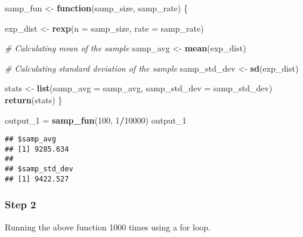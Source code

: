 \documentclass[]{article}
\newenvironment{Shaded}{\begin{snugshade}}{\end{snugshade}}
\newcommand{\KeywordTok}[1]{\textcolor[rgb]{0.13,0.29,0.53}{\textbf{#1}}}
\newcommand{\DataTypeTok}[1]{\textcolor[rgb]{0.13,0.29,0.53}{#1}}
\newcommand{\DecValTok}[1]{\textcolor[rgb]{0.00,0.00,0.81}{#1}}
\newcommand{\StringTok}[1]{\textcolor[rgb]{0.31,0.60,0.02}{#1}}
\newcommand{\CommentTok}[1]{\textcolor[rgb]{0.56,0.35,0.01}{\textit{#1}}}
\newcommand{\ControlFlowTok}[1]{\textcolor[rgb]{0.13,0.29,0.53}{\textbf{#1}}}
\newcommand{\OperatorTok}[1]{\textcolor[rgb]{0.81,0.36,0.00}{\textbf{#1}}}
\newcommand{\NormalTok}[1]{#1}
\begin{document}
\begin{Shaded}
\begin{Highlighting}[]
\NormalTok{samp_fun <-}\StringTok{ }\ControlFlowTok{function}\NormalTok{(samp_size, samp_rate) \{}
  
\NormalTok{  exp_dist <-}\StringTok{ }\KeywordTok{rexp}\NormalTok{(}\DataTypeTok{n =}\NormalTok{ samp_size, }\DataTypeTok{rate =}\NormalTok{ samp_rate)}
  
  \CommentTok{# Calculating mean of the sample}
\NormalTok{  samp_avg <-}\StringTok{ }\KeywordTok{mean}\NormalTok{(exp_dist)}
  
  \CommentTok{# Calculating standard deviation of the sample}
\NormalTok{  samp_std_dev <-}\StringTok{ }\KeywordTok{sd}\NormalTok{(exp_dist)}
  
\NormalTok{  stats <-}\StringTok{ }\KeywordTok{list}\NormalTok{(}\DataTypeTok{samp_avg =}\NormalTok{ samp_avg, }\DataTypeTok{samp_std_dev =}\NormalTok{ samp_std_dev)}
  \KeywordTok{return}\NormalTok{(stats)}
\NormalTok{\}}

\NormalTok{output_}\DecValTok{1}\NormalTok{ =}\StringTok{ }\KeywordTok{samp_fun}\NormalTok{(}\DecValTok{100}\NormalTok{, }\DecValTok{1}\OperatorTok{/}\DecValTok{10000}\NormalTok{)}
\NormalTok{output_}\DecValTok{1}
\end{Highlighting}
\end{Shaded}

\begin{verbatim}
## $samp_avg
## [1] 9285.634
## 
## $samp_std_dev
## [1] 9422.527
\end{verbatim}

\subsubsection{Step 2}\label{step-2}

Running the above function 1000 times using a for loop.

\begin{Shaded}
\end{Shaded}
\end{document}
